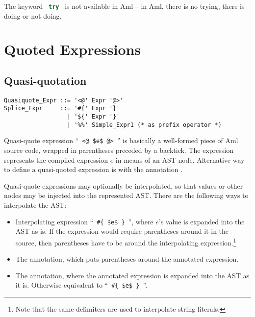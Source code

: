 The keyword ~\lstinline[language=Java]!try!~ is not available in Aml -- in Aml, there is no trying, there is doing or not doing.  






\section{Quoted Expressions}
\label{sec:syntactic-forms}






\subsection{Quasi-quotation}
\label{sec:quasi-quotation}

\syntax\begin{lstlisting}[mathescape=false]
Quasiquote_Expr ::= '<@' Expr '@>'
Splice_Expr     ::= '#{' Expr '}'
                  | '${' Expr '}'
                  | '%%' Simple_Expr1 (* as prefix operator *)
\end{lstlisting}

Quasi-quote expression ``~\lstinline!<@ $e$ @>!~'' is basically a well-formed piece of Aml source code, wrapped in parentheses preceded by a backtick. The expression represents the compiled expression $e$ in means of an AST node. Alternative way to define a quasi-quoted expression is with the annotation .

Quasi-quote expressions may optionally be interpolated, so that values or other nodes may be injected into the represented AST. There are the following ways to interpolate the AST:
\begin{itemize}
  \item Interpolating expression ``~\lstinline!#{ $e$ }!~'', where $e$'s value is expanded into the AST as is. If the expression would require parentheses around it in the source, then parentheses have to be around the interpolating expression.\footnote{Note that the same delimiters are used to interpolate string literals.}
  \item The  annotation, which puts parentheses around the annotated expression.
  \item The  annotation, where the annotated expression is expanded into the AST as it is. Otherwise equivalent to ``~\lstinline!#{ $e$ }!~''.
\end{itemize}

